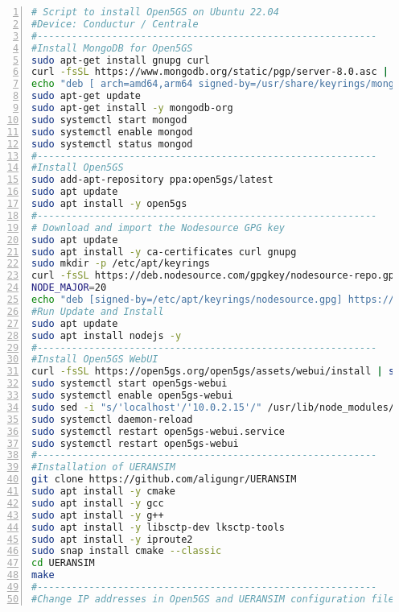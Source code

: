 \begin{lstlisting}[basicstyle=\small, frame=single, breaklines=true, postbreak=\mbox{\textcolor{red}{$\hookrightarrow$}\space}, escapeinside ={\%,}, escapechar={!}, numbers=left, language=sh, caption=Vagrant script voor Conductor VM of 5G Core Server]
# Script to install Open5GS on Ubuntu 22.04
#Device: Conductur / Centrale
#-----------------------------------------------------------
#Install MongoDB for Open5GS
sudo apt-get install gnupg curl
curl -fsSL https://www.mongodb.org/static/pgp/server-8.0.asc | sudo gpg -o /usr/share/keyrings/mongodb-server-8.0.gpg --dearmor
echo "deb [ arch=amd64,arm64 signed-by=/usr/share/keyrings/mongodb-server-8.0.gpg ] https://repo.mongodb.org/apt/ubuntu noble/mongodb-org/8.0 multiverse" | sudo tee /etc/apt/sources.list.d/mongodb-org-8.0.list
sudo apt-get update
sudo apt-get install -y mongodb-org
sudo systemctl start mongod
sudo systemctl enable mongod
sudo systemctl status mongod
#-----------------------------------------------------------
#Install Open5GS
sudo add-apt-repository ppa:open5gs/latest
sudo apt update
sudo apt install -y open5gs
#-----------------------------------------------------------
# Download and import the Nodesource GPG key
sudo apt update
sudo apt install -y ca-certificates curl gnupg
sudo mkdir -p /etc/apt/keyrings
curl -fsSL https://deb.nodesource.com/gpgkey/nodesource-repo.gpg.key | sudo gpg --dearmor -o /etc/apt/keyrings/nodesource.gpg
NODE_MAJOR=20
echo "deb [signed-by=/etc/apt/keyrings/nodesource.gpg] https://deb.nodesource.com/node_$NODE_MAJOR.x nodistro main" | sudo tee /etc/apt/sources.list.d/nodesource.list
#Run Update and Install
sudo apt update
sudo apt install nodejs -y
#-----------------------------------------------------------
#Install Open5GS WebUI
curl -fsSL https://open5gs.org/open5gs/assets/webui/install | sudo -E bash -
sudo systemctl start open5gs-webui
sudo systemctl enable open5gs-webui
sudo sed -i "s/'localhost'/'10.0.2.15'/" /usr/lib/node_modules/open5gs/server/index.js # Change localhost
sudo systemctl daemon-reload
sudo systemctl restart open5gs-webui.service
sudo systemctl restart open5gs-webui
#-----------------------------------------------------------
#Installation of UERANSIM
git clone https://github.com/aligungr/UERANSIM
sudo apt install -y cmake
sudo apt install -y gcc
sudo apt install -y g++
sudo apt install -y libsctp-dev lksctp-tools
sudo apt install -y iproute2
sudo snap install cmake --classic
cd UERANSIM
make
#-----------------------------------------------------------
#Change IP addresses in Open5GS and UERANSIM configuration files

\end{lstlisting}
